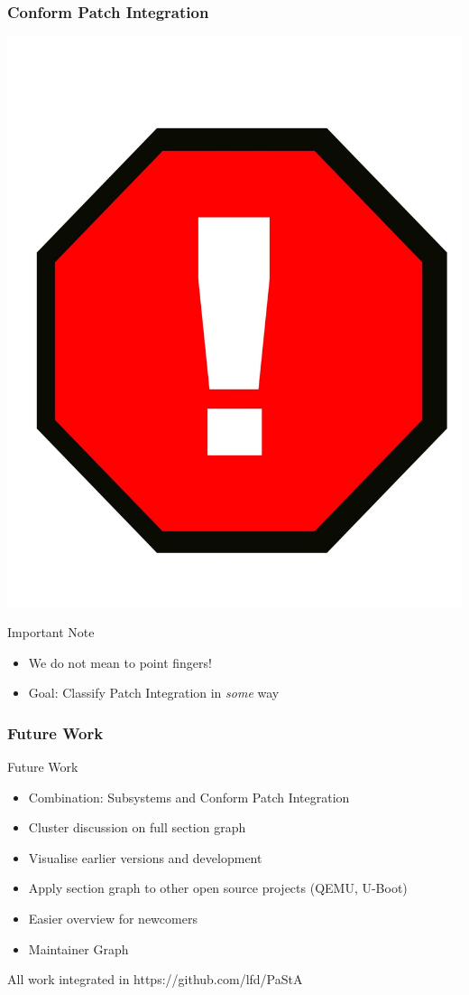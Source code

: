 \documentclass{beamer}
\begin{document}
	\begin{frame}
	\frametitle{Conform Patch Integration}
	\begin{center}
	\includegraphics[scale=0.05]{pics/exclamation.jpeg}
	\end{center}

		\begin{alertblock}{Important Note}
			\begin{itemize}
				\item We do not mean to point fingers!
				\item Goal: Classify Patch Integration in \textit{some} way
			\end{itemize}
		\end{alertblock}
	\end{frame}

	\begin{frame}
	\frametitle{Future Work}
		\begin{block}{Future Work}
			\begin{itemize}
				\item Combination: Subsystems and Conform Patch Integration
				\item Cluster discussion on full section graph
				\item Visualise earlier versions and development
				\item Apply section graph to other open source projects (QEMU, U-Boot)
				\item Easier overview for newcomers
				\item Maintainer Graph
			\end{itemize}
		\end{block}

		All work integrated in https://github.com/lfd/PaStA
	\end{frame}
\end{document}
